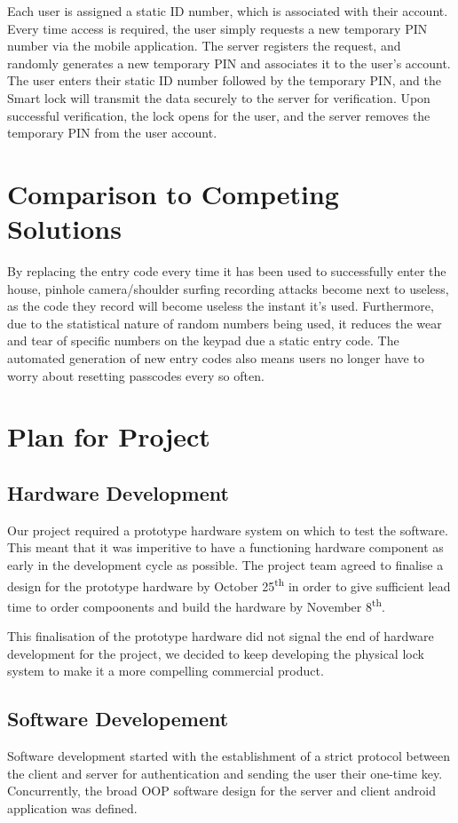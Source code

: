 \documentclass[conference]{IEEEtran}
\begin{document}
	Each user is assigned a static ID number, which is associated with their account. Every time access is required, the user simply requests a new temporary PIN number via the mobile application. The server registers the request, and randomly generates a new temporary PIN and associates it to the user's account. The user enters their static ID number followed by the temporary PIN, and the Smart lock will transmit the data securely to the server for verification. Upon successful verification, the lock opens for the user, and the server removes the temporary PIN from the user account.

\section{Comparison to Competing Solutions}
	By replacing the entry code every time it has been used to successfully enter the house, pinhole camera/shoulder surfing recording attacks become next to useless, as the code they record will become useless the instant it’s used. Furthermore, due to the statistical nature of random numbers being used, it reduces the wear and tear of specific numbers on the keypad due a static entry code. The automated generation of new entry codes also means users no longer have to worry about resetting passcodes every so often.

\section{Plan for Project}
\subsection{Hardware Development}
	Our project required a prototype hardware system on which to test the software. This meant that it was imperitive to have a functioning hardware component as early in the development cycle as possible. The project team agreed to finalise a design for the prototype hardware by October 25\textsuperscript{th} in order to give sufficient lead time to order compoonents and build the hardware by November 8\textsuperscript{th}.


	This finalisation of the prototype hardware did not signal the end of hardware development for the project, we decided to keep developing the physical lock system to make it a more compelling commercial product.

\subsection{Software Developement}
	Software development started with the establishment of a strict protocol between the client and server for authentication and sending the user their one-time key. Concurrently, the broad OOP software design for the server and client android application was defined.
\end{document}
